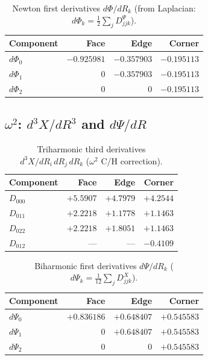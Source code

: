 \documentclass[11pt,a4paper]{article}
\theoremstyle{plain}
\theoremstyle{remark}
\begin{document}
\begin{table}[ht]
\centering
\caption{Newton first derivatives $d\Phi/dR_k$ (from Laplacian: $d\Phi_k = \tfrac{1}{2}\sum_j D^{\Psi}_{jjk}$).}
\label{tab:dphi}
\begin{tabular}{l*{3}{r}}
\toprule
Component & Face & Edge & Corner \\
\midrule
$d\Phi_0$ & $-0.925981$ & $-0.357903$ & $-0.195113$ \\
$d\Phi_1$ & $0$ & $-0.357903$ & $-0.195113$ \\
$d\Phi_2$ & $0$ & $0$ & $-0.195113$ \\
\bottomrule
\end{tabular}
\end{table}

\subsection{$\omega^2$: $d^3 X/dR^3$ and $d\Psi/dR$}

\begin{table}[ht]
\centering
\caption{Triharmonic third derivatives $d^3 X/dR_i\,dR_j\,dR_k$ ($\omega^2$ C/H correction).}
\label{tab:d3X}
\begin{tabular}{l*{3}{r}}
\toprule
Component & Face & Edge & Corner \\
\midrule
$D_{000}$ & $+5.5907$ & $+4.7979$ & $+4.2544$ \\
$D_{011}$ & $+2.2218$ & $+1.1778$ & $+1.1463$ \\
$D_{022}$ & $+2.2218$ & $+1.8051$ & $+1.1463$ \\
$D_{012}$ & --- & --- & $-0.4109$ \\
\bottomrule
\end{tabular}
\end{table}

\begin{table}[ht]
\centering
\caption{Biharmonic first derivatives $d\Psi/dR_k$
($d\Psi_k = \tfrac{1}{12}\sum_j D^X_{jjk}$).}
\label{tab:dpsi}
\begin{tabular}{l*{3}{r}}
\toprule
Component & Face & Edge & Corner \\
\midrule
$d\Psi_0$ & $+0.836186$ & $+0.648407$ & $+0.545583$ \\
$d\Psi_1$ & $0$ & $+0.648407$ & $+0.545583$ \\
$d\Psi_2$ & $0$ & $0$ & $+0.545583$ \\
\bottomrule
\end{tabular}
\end{table}
\end{document}
